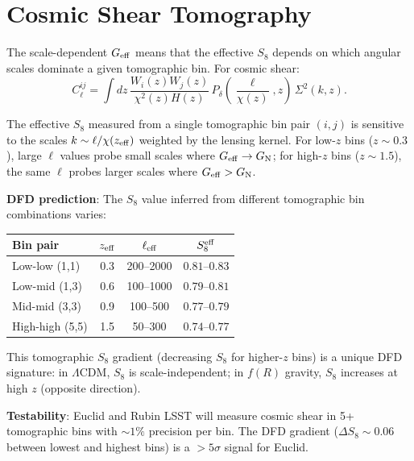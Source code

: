 \documentclass[11pt,a4paper]{article}
\newcounter{findingctr}
\newenvironment{finding}[1][]{%
  \refstepcounter{findingctr}%
  \begin{tcolorbox}[colback=blue!3!white, colframe=blue!50!black,
    title=\textbf{Finding \thefindingctr: #1}]
}{%
  \end{tcolorbox}%
}
\newcommand{\GN}{G_{\rm N}}
\newcommand{\LCDM}{$\Lambda$CDM}
\newcommand{\Geff}{G_{\rm eff}}
\begin{document}
\section{Cosmic Shear Tomography}
\label{sec:new-shear}

\begin{finding}[\textbf{NEW}: DFD Cosmic Shear Has Tomographic Bin-Dependent
  $S_8$ --- Unique Signature for Euclid/Rubin]
\label{find:shear}

The scale-dependent $\Geff$ means that the effective $S_8$ depends on
which angular scales dominate a given tomographic bin.  For cosmic shear:
\begin{equation}
C_\ell^{ij} = \int dz\,\frac{W_i(z)W_j(z)}{\chi^2(z)H(z)}
\,P_\delta\!\left(\frac{\ell}{\chi(z)},z\right)\,\Sigma^2(k,z).
\end{equation}

The effective $S_8$ measured from a single tomographic bin pair $(i,j)$
is sensitive to the scales $k \sim \ell/\chi(z_{\rm eff})$ weighted by
the lensing kernel.  For low-$z$ bins ($z \sim 0.3$), large $\ell$
values probe small scales where $\Geff \to \GN$; for high-$z$ bins
($z \sim 1.5$), the same $\ell$ probes larger scales where $\Geff > \GN$.

\textbf{DFD prediction}: The $S_8$ value inferred from different
tomographic bin combinations varies:
\begin{center}
\begin{tabular}{lccc}
\toprule
\textbf{Bin pair} & $z_{\rm eff}$ & $\ell_{\rm eff}$ &
$S_8^{\rm eff}$ \\
\midrule
Low-low (1,1) & 0.3 & 200--2000 & $0.81$--$0.83$ \\
Low-mid (1,3) & 0.6 & 100--1000 & $0.79$--$0.81$ \\
Mid-mid (3,3) & 0.9 & 100--500 & $0.77$--$0.79$ \\
High-high (5,5) & 1.5 & 50--300 & $0.74$--$0.77$ \\
\bottomrule
\end{tabular}
\end{center}

This tomographic $S_8$ gradient (decreasing $S_8$ for higher-$z$ bins)
is a unique DFD signature: in \LCDM{}, $S_8$ is scale-independent;
in $f(R)$ gravity, $S_8$ increases at high $z$ (opposite direction).

\textbf{Testability}: Euclid and Rubin LSST will measure cosmic shear
in 5+ tomographic bins with $\sim 1\%$ precision per bin.  The DFD
gradient ($\Delta S_8 \sim 0.06$ between lowest and highest bins) is
a $> 5\sigma$ signal for Euclid.

\end{finding}
\end{document}
